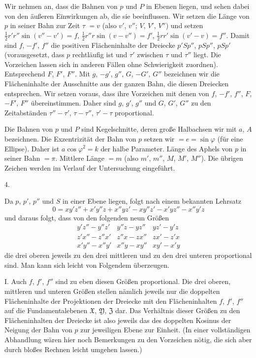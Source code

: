 Wir nehmen an, dass die Bahnen von $p$ und $P$ in Ebenen liegen, und sehen dabei von den äußeren Einwirkungen ab, die sie beeinflussen. Wir setzen die Länge von $p$ in seiner Bahn zur Zeit $\tau$ $=v$ (also $v'$, $v''$; $V$, $V'$, $V''$) und setzen $\frac12r'r''\sin(v''-v')=f$, $\frac12r''r\sin(v-v'')=f'$, $\frac12rr'\sin(v'-v)=f''$. Damit sind $f$, $-f'$, $f''$ die positiven Flächeninhalte der Dreiecke $p'Sp''$, $pSp''$, $pSp'$ (vorausgesetzt, dass $p$ rechtläufig ist und $\tau'$ zwischen $\tau$ und $\tau''$ liegt. Die Vorzeichen lassen sich in anderen Fällen ohne Schwierigkeit zuordnen). Entsprechend $F$, $F'$, $F''$. Mit $g$, $-g'$, $g''$, $G$, $-G'$, $G''$ bezeichnen wir die Flächeninhalte der Ausschnitte aus der ganzen Bahn, die diesen Dreiecken entsprechen. Wir setzen voraus, dass ihre Vorzeichen mit denen von $f$, $-f'$, $f''$, $F$, $-F'$, $F''$ übereinstimmen. Daher sind $g$, $g'$, $g''$ und $G$, $G'$, $G''$ zu den Zeitabständen $\tau''-\tau'$, $\tau-\tau''$, $\tau'-\tau$ proportional.

%
Die Bahnen von $p$ und $P$ sind Kegelschnitte, deren große Halbachsen wir mit $a$, $A$ bezeichnen. Die Exzentrizität der Bahn von $p$ setzen wir $=e=\sin\varphi$ (für eine Ellipse). Daher ist $a\cos\varphi^2=k$ der halbe Parameter. Länge des Aphels von $p$ in seiner Bahn $=\pi$. Mittlere Länge $=m$ (also $m'$, $m''$, $M$, $M'$, $M''$). Die übrigen Zeichen werden im Verlauf der Untersuchung eingeführt.

\begin{center}4.\end{center}
Da $p$, $p'$, $p''$ und $S$ in einer Ebene liegen, folgt nach einem bekannten Lehrsatz
\[
0=xy'z''+x'y''z+x''yz'-xy''z'-x'yz''-x''y'z
\]
und daraus folgt, dass von den folgenden neun Größen
\[
\begin{array}{ccc}
y'z''-y''z'&y''z-yz''&yz'-y'z\\
z'x''-z''x'&z''x-zx''&zx'-z'x\\
x'y''-x''y'&x''y-xy''&xy'-x'y
\end{array}
\]
die drei oberen jeweils zu den drei mittleren und zu den drei unteren proportional sind. Man kann sich leicht von Folgendem überzeugen.

I. Auch $f$, $f'$, $f''$ sind zu eben diesen Größen proportional. Die drei oberen, mittleren und unteren Größen stellen nämlich jeweils nur die doppelten Flächeninhalte der Projektionen der Dreiecke mit den Flächeninhalten $f$, $f'$, $f''$ auf die Fundamentalebenen $\mathfrak{X}$, $\mathfrak{Y}$, $\mathfrak{Z}$ dar. Das Verhältnis dieser Größen zu den Flächeninhalten der Dreiecke ist also jeweils das des doppelten Kosinus der Neigung der Bahn von $p$ zur jeweiligen Ebene zur Einheit. (In einer vollständigen Abhandlung wären hier noch Bemerkungen zu den Vorzeichen nötig, die sich aber durch bloßes Rechnen leicht umgehen lassen.)

